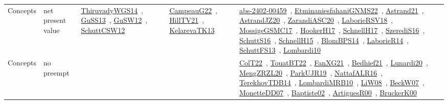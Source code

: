 {\begin{longtable}{lp{3cm}>{\raggedright\arraybackslash}p{6cm}>{\raggedright\arraybackslash}p{6cm}>{\raggedright\arraybackslash}p{8cm}}
Concepts & net present value & \href{../works/ThiruvadyWGS14.pdf}{ThiruvadyWGS14}~\cite{ThiruvadyWGS14}, \href{../works/GuSS13.pdf}{GuSS13}~\cite{GuSS13}, \href{../works/GuSW12.pdf}{GuSW12}~\cite{GuSW12}, \href{../works/SchuttCSW12.pdf}{SchuttCSW12}~\cite{SchuttCSW12} & \href{../works/CampeauG22.pdf}{CampeauG22}~\cite{CampeauG22}, \href{../works/HillTV21.pdf}{HillTV21}~\cite{HillTV21}, \href{../works/KelarevaTK13.pdf}{KelarevaTK13}~\cite{KelarevaTK13} & \href{../works/abs-2402-00459.pdf}{abs-2402-00459}~\cite{abs-2402-00459}, \href{../works/EtminaniesfahaniGNMS22.pdf}{EtminaniesfahaniGNMS22}~\cite{EtminaniesfahaniGNMS22}, \href{../works/Astrand21.pdf}{Astrand21}~\cite{Astrand21}, \href{../works/AstrandJZ20.pdf}{AstrandJZ20}~\cite{AstrandJZ20}, \href{../works/ZarandiASC20.pdf}{ZarandiASC20}~\cite{ZarandiASC20}, \href{../works/LaborieRSV18.pdf}{LaborieRSV18}~\cite{LaborieRSV18}, \href{../works/MossigeGSMC17.pdf}{MossigeGSMC17}~\cite{MossigeGSMC17}, \href{../works/HookerH17.pdf}{HookerH17}~\cite{HookerH17}, \href{../works/SchnellH17.pdf}{SchnellH17}~\cite{SchnellH17}, \href{../works/SzerediS16.pdf}{SzerediS16}~\cite{SzerediS16}, \href{../works/SchuttS16.pdf}{SchuttS16}~\cite{SchuttS16}, \href{../works/SchnellH15.pdf}{SchnellH15}~\cite{SchnellH15}, \href{../works/BlomBPS14.pdf}{BlomBPS14}~\cite{BlomBPS14}, \href{../works/LaborieR14.pdf}{LaborieR14}~\cite{LaborieR14}, \href{../works/SchuttFS13.pdf}{SchuttFS13}~\cite{SchuttFS13}, \href{../works/Lombardi10.pdf}{Lombardi10}~\cite{Lombardi10}\\
Concepts & no preempt &  &  & \href{../works/ColT22.pdf}{ColT22}~\cite{ColT22}, \href{../works/TouatBT22.pdf}{TouatBT22}~\cite{TouatBT22}, \href{../works/FanXG21.pdf}{FanXG21}~\cite{FanXG21}, \href{../works/Bedhief21.pdf}{Bedhief21}~\cite{Bedhief21}, \href{../works/Lunardi20.pdf}{Lunardi20}~\cite{Lunardi20}, \href{../works/MengZRZL20.pdf}{MengZRZL20}~\cite{MengZRZL20}, \href{../works/ParkUJR19.pdf}{ParkUJR19}~\cite{ParkUJR19}, \href{../works/NattafALR16.pdf}{NattafALR16}~\cite{NattafALR16}, \href{../works/TerekhovTDB14.pdf}{TerekhovTDB14}~\cite{TerekhovTDB14}, \href{../works/LombardiMRB10.pdf}{LombardiMRB10}~\cite{LombardiMRB10}, \href{../works/LiW08.pdf}{LiW08}~\cite{LiW08}, \href{../works/BeckW07.pdf}{BeckW07}~\cite{BeckW07}, \href{../works/MonetteDD07.pdf}{MonetteDD07}~\cite{MonetteDD07}, \href{../works/Baptiste02.pdf}{Baptiste02}~\cite{Baptiste02}, \href{../works/ArtiguesR00.pdf}{ArtiguesR00}~\cite{ArtiguesR00}, \href{../works/BruckerK00.pdf}{BruckerK00}~\cite{BruckerK00}\\

\end{longtable}}
